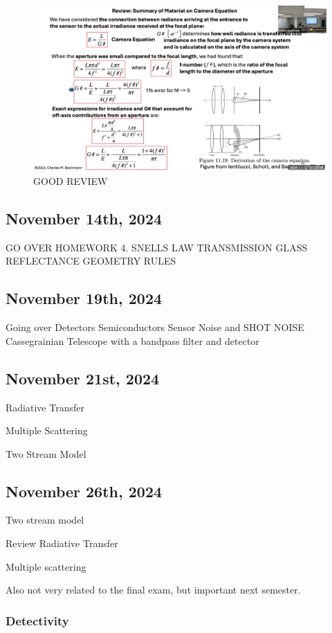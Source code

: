 \documentclass{article}
\begin{document}
\begin{figure}[h!]
\centering
\includegraphics[scale=.35]{Radiometry/Camera_Comp.png}
\caption{GOOD REVIEW}
\label{fig:POSSIBLE EXAM QUESTION}
\end{figure}


\subsection{November 14th, 2024}

GO OVER HOMEWORK 4. 
SNELLS LAW
TRANSMISSION
GLASS
REFLECTANCE
GEOMETRY RULES

\subsection{November 19th, 2024}

Going over Detectors 
Semiconductors
Sensor Noise and SHOT NOISE
Cassegrainian Telescope with a bandpass filter and detector


\subsection{November 21st, 2024}
Radiative Transfer

Multiple Scattering 

Two Stream Model


\subsection{November 26th, 2024}
Two stream model

Review Radiative Transfer

Multiple scattering 


Also not very related to the final exam, but important next semester.
\subsubsection{Detectivity}
\end{document}
